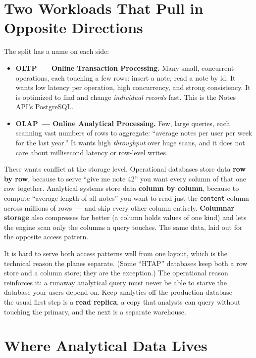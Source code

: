 \setcounter{section}{0}
\section{Two Workloads That Pull in Opposite Directions}\label{42-data-analytics-plane:421-two-workloads-that-pull-in-opposite-directions}

The split has a name on each side:

\begin{itemize}
\tightlist
\item
  \textbf{OLTP~--- Online Transaction Processing.} Many small, concurrent operations, each touching a few rows: insert a note, read a note by id. It wants low latency per operation, high concurrency, and strong consistency. It is optimized to find and change \emph{individual records} fast. This is the Notes API's PostgreSQL.
\item
  \textbf{OLAP~--- Online Analytical Processing.} Few, large queries, each scanning vast numbers of rows to aggregate: ``average notes per user per week for the last year.'' It wants high \emph{throughput} over huge scans, and it does not care about millisecond latency or row-level writes.
\end{itemize}

\noindent{}These wants conflict at the storage level. Operational databases store data \textbf{row by row}, because to serve ``give me note 42'' you want every column of that one row together. Analytical systems store data \textbf{column by column}, because to compute ``average length of all notes'' you want to read just the \texttt{content} column across millions of rows~--- and skip every other column entirely. \textbf{Columnar storage} also compresses far better (a column holds values of one kind) and lets the engine scan only the columns a query touches. The same data, laid out for the opposite access pattern.

It is hard to serve both access patterns well from one layout, which is the technical reason the planes separate. (Some ``HTAP'' databases keep both a row store and a column store; they are the exception.) The operational reason reinforces it: a runaway analytical query must never be able to starve the database your users depend on. Keep analytics off the production database~--- the usual first step is a \textbf{read replica}, a copy that analysts can query without touching the primary, and the next is a separate warehouse.

\setcounter{section}{1}
\section{Where Analytical Data Lives}\label{42-data-analytics-plane:422-where-analytical-data-lives}

